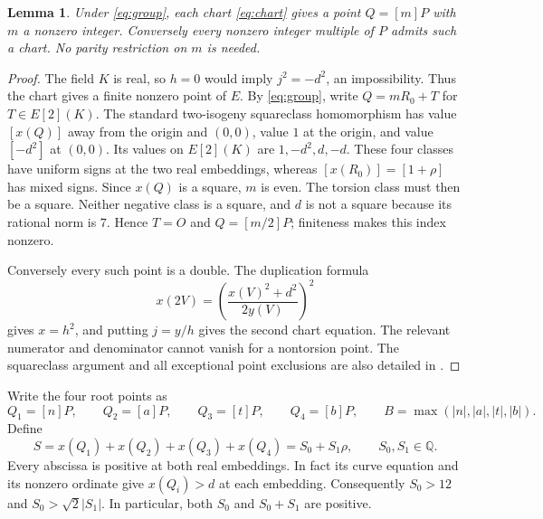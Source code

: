 \documentclass[11pt,a4paper]{article}
\newtheorem{lemma}[theorem]{Lemma}
\theoremstyle{remark}\newtheorem{remark}[theorem]{Remark}
\newcommand{\Q}{\mathbb Q}\newcommand{\Z}{\mathbb Z}
\begin{document}
\begin{lemma}\label{lem:indices}
Under \eqref{eq:group}, each chart \eqref{eq:chart} gives a point
$Q=[m]P$ with $m$ a nonzero integer. Conversely every nonzero
integer multiple of $P$ admits such a chart. No parity restriction
on $m$ is needed.
\end{lemma}
\begin{proof}
The field $K$ is real, so $h=0$ would imply $j^2=-d^2$, an
impossibility. Thus the chart gives a finite nonzero point of $E$.
By \eqref{eq:group}, write $Q=mR_0+T$ for $T\in E[2](K)$.
The standard two-isogeny squareclass homomorphism has value
$[x(Q)]$ away from the origin and $(0,0)$, value $1$ at the origin,
and value $[-d^2]$ at $(0,0)$. Its values on $E[2](K)$ are
$1,-d^2,d,-d$. These four classes have uniform signs at the
two real embeddings, whereas $[x(R_0)]=[1+\rho]$ has mixed
signs. Since $x(Q)$ is a square, $m$ is even. The torsion class
must then be a square. Neither negative class is a square, and
$d$ is not a square because its rational norm is $7$. Hence
$T=O$ and $Q=[m/2]P$; finiteness makes this index nonzero.

Conversely every such point is a double. The duplication formula
\[
 x(2V)=\left(\frac{x(V)^2+d^2}{2y(V)}\right)^2
\]
gives $x=h^2$, and putting $j=y/h$ gives the second chart equation.
The relevant numerator and denominator cannot vanish for a
nontorsion point. The squareclass argument and all exceptional
point exclusions are also detailed in \cite[Section 2]{Quartic317}.
\end{proof}

Write the four root points as
\[
 Q_1=[n]P,\qquad Q_2=[a]P,\qquad
 Q_3=[t]P,\qquad Q_4=[b]P,
 \qquad B=\max(|n|,|a|,|t|,|b|).
\]
Define
\[
 S=x(Q_1)+x(Q_2)+x(Q_3)+x(Q_4)=S_0+S_1\rho,
 \qquad S_0,S_1\in\Q.
\]
Every abscissa is positive at both real embeddings. In fact its
curve equation and its nonzero ordinate give $x(Q_i)>d$ at each
embedding. Consequently $S_0>12$ and $S_0>\sqrt2|S_1|$.
In particular, both $S_0$ and $S_0+S_1$ are positive.
\end{document}
